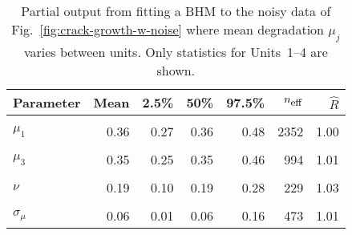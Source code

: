 \begin{table}
\centering
\caption{\label{tab:pp_mu}Partial output from fitting a BHM to the noisy data of Fig.~\ref{fig:crack-growth-w-noise} where mean degradation $\mu_j$ varies between units. Only statistics for Units~1--4 are shown.}
\centering
\begin{tabular}[t]{lrrrrrr}
\toprule
Parameter & Mean & 2.5\% & 50\% & 97.5\% & $n_{\small{\mbox{eff}}}$ & $\hat{R}$\\
\midrule
\cellcolor{gray!10}{$\sigma$} & \cellcolor{gray!10}{0.03} & \cellcolor{gray!10}{0.02} & \cellcolor{gray!10}{0.03} & \cellcolor{gray!10}{0.04} & \cellcolor{gray!10}{728} & \cellcolor{gray!10}{1.01}\\
$\mu_1$ & 0.36 & 0.27 & 0.36 & 0.48 & 2352 & 1.00\\
\cellcolor{gray!10}{$\mu_2$} & \cellcolor{gray!10}{0.42} & \cellcolor{gray!10}{0.32} & \cellcolor{gray!10}{0.41} & \cellcolor{gray!10}{0.56} & \cellcolor{gray!10}{1260} & \cellcolor{gray!10}{1.00}\\
$\mu_3$ & 0.35 & 0.25 & 0.35 & 0.46 & 994 & 1.01\\
\cellcolor{gray!10}{$\mu_4$} & \cellcolor{gray!10}{0.34} & \cellcolor{gray!10}{0.23} & \cellcolor{gray!10}{0.35} & \cellcolor{gray!10}{0.46} & \cellcolor{gray!10}{866} & \cellcolor{gray!10}{1.01}\\
\addlinespace
$\nu$ & 0.19 & 0.10 & 0.19 & 0.28 & 229 & 1.03\\
\cellcolor{gray!10}{$\mu_\mu$} & \cellcolor{gray!10}{0.38} & \cellcolor{gray!10}{0.32} & \cellcolor{gray!10}{0.38} & \cellcolor{gray!10}{0.46} & \cellcolor{gray!10}{2936} & \cellcolor{gray!10}{1.00}\\
$\sigma_\mu$ & 0.06 & 0.01 & 0.06 & 0.16 & 473 & 1.01\\
\bottomrule
\end{tabular}
\end{table}
